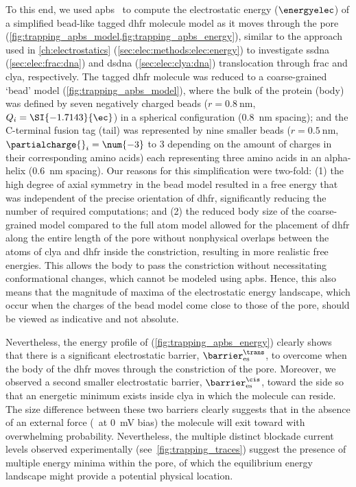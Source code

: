 To this end, we used \gls{apbs}~\cite{Baker-2001,Dolinsky-2004,Dolinsky-2007,Li-2005} to compute the
electrostatic energy ($\energyelec$) of a simplified bead-like tagged \gls{dhfr} molecule model as it moves
through the pore (\cref{fig:trapping_apbs_model,fig:trapping_apbs_energy}), similar to the approach used in
\cref{ch:electrostatics} (\cref{sec:elec:methods:elec:energy}) to investigate \gls{ssdna}
(\cref{sec:elec:frac:dna}) and \gls{dsdna} (\cref{sec:elec:clya:dna}) translocation through \gls{frac} and
\gls{clya}, respectively. The tagged \gls{dhfr} molecule was reduced to a coarse-grained `bead' model
(\cref{fig:trapping_apbs_model}), where the bulk of the protein (body) was defined by seven negatively charged
beads ($r = \SI{0.8}{\nm}$, $Q_i = \SI{-1.7143}{\ec}$) in a spherical configuration (\SI{0.8}{\nm} spacing);
and the C-terminal fusion tag (tail) was represented by nine smaller beads ($r = \SI{0.5}{\nm}$,
$\partialcharge{}_i = \num{-3}$ to \SI{+3}{\ec} depending on the amount of charges in their corresponding
amino acids) each representing three amino acids in an alpha-helix (\SI{0.6}{\nm}   spacing). Our reasons for
this simplification were two-fold: (1) the high degree of axial symmetry in the bead model resulted in a free
energy that was independent of the precise orientation of \gls{dhfr}, significantly reducing the number of
required computations; and (2) the reduced body size of the coarse-grained model compared to the full atom
model allowed for the placement of \gls{dhfr} along the entire length of the pore without nonphysical overlaps
between the atoms of \gls{clya} and \gls{dhfr} inside the \transi{} constriction, resulting in more realistic
free energies. This allows the body to pass the constriction without necessitating conformational changes,
which cannot be modeled using \gls{apbs}. Hence, this also means that the magnitude of maxima of the
electrostatic energy landscape, which occur when the charges of the bead model come close to those of the
pore, should be viewed as indicative and not absolute.

Nevertheless, the energy profile of \DHFRt{} (\cref{fig:trapping_apbs_energy}) clearly shows that there is a
significant electrostatic barrier, $\barrier^{\trans}_{\rm{es}}$, to overcome when the body of the \gls{dhfr}
moves through the constriction of the pore. Moreover, we observed a second smaller electrostatic barrier,
$\barrier^{\cis}_{\rm{es}}$, toward the \cisi{} side so that an energetic minimum exists inside \gls{clya} in
which the molecule can reside. The size difference between these two barriers clearly suggests that in the
absence of an external force (\ie~at \SI{0}{\mV} bias) the molecule will exit toward \cisi{} with overwhelming
probability. Nevertheless, the multiple distinct blockade current levels observed experimentally
(see~\cref{fig:trapping_traces}) suggest the presence of multiple energy minima within the pore, of which the
equilibrium energy landscape might provide a potential physical location.

